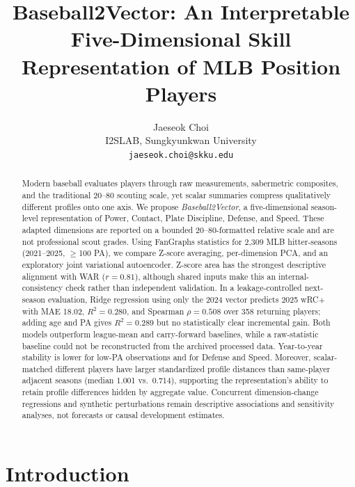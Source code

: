 \documentclass[10pt,twocolumn,letterpaper]{article}
\begin{document}
\title{Baseball2Vector: An Interpretable Five-Dimensional Skill Representation of MLB Position Players}

\author{Jaeseok Choi\\
I2SLAB, Sungkyunkwan University\\
{\tt\small jaeseok.choi@skku.edu}
}

\maketitle

\begin{abstract}
Modern baseball evaluates players through raw measurements, sabermetric composites, and the traditional 20--80 scouting scale, yet scalar summaries compress qualitatively different profiles onto one axis. We propose \emph{Baseball2Vector}, a five-dimensional season-level representation of Power, Contact, Plate Discipline, Defense, and Speed. These adapted dimensions are reported on a bounded 20--80-formatted relative scale and are not professional scout grades. Using FanGraphs statistics for 2{,}309 MLB hitter-seasons (2021--2025, $\geq$100 PA), we compare Z-score averaging, per-dimension PCA, and an exploratory joint variational autoencoder. Z-score area has the strongest descriptive alignment with WAR ($r=0.81$), although shared inputs make this an internal-consistency check rather than independent validation. In a leakage-controlled next-season evaluation, Ridge regression using only the 2024 vector predicts 2025 wRC+ with MAE 18.02, $R^2=0.280$, and Spearman $\rho=0.508$ over 358 returning players; adding age and PA gives $R^2=0.289$ but no statistically clear incremental gain. Both models outperform league-mean and carry-forward baselines, while a raw-statistic baseline could not be reconstructed from the archived processed data. Year-to-year stability is lower for low-PA observations and for Defense and Speed. Moreover, scalar-matched different players have larger standardized profile distances than same-player adjacent seasons (median 1.001 vs.\ 0.714), supporting the representation's ability to retain profile differences hidden by aggregate value. Concurrent dimension-change regressions and synthetic perturbations remain descriptive associations and sensitivity analyses, not forecasts or causal development estimates.
\end{abstract}

\section{Introduction}
\label{sec:intro}
\end{document}

